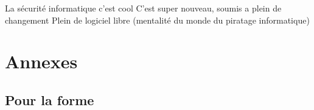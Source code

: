 \documentclass[a4paper]{memoir}
\begin{document}
La sécurité informatique c'est cool
C'est super nouveau, soumis a plein de changement
Plein de logiciel libre (mentalité du monde du piratage informatique)


\part*{Annexes}
\appendix

\chapter{Pour la forme}


\backmatter%

\nocite{*}



\printindex
\end{document}

